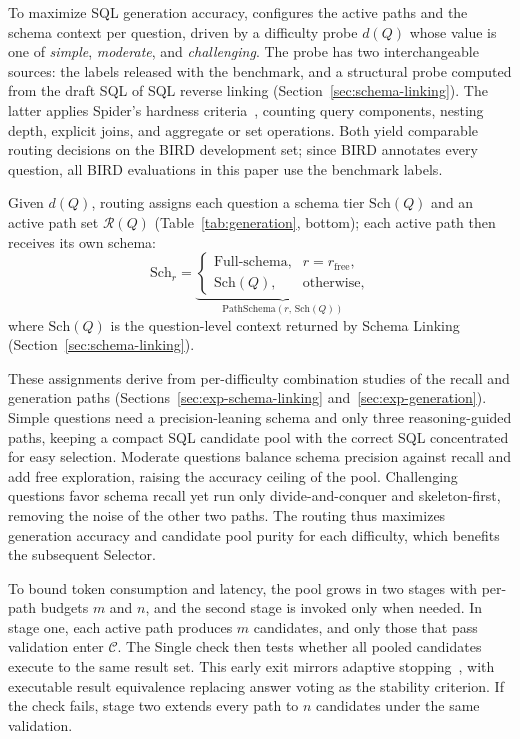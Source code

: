 To maximize SQL generation accuracy, \systemname{} configures the active paths and the
schema context per question, driven by a difficulty probe $d(Q)$ whose value is one of
\emph{simple}, \emph{moderate}, and \emph{challenging}. The probe has two interchangeable
sources: the labels released with the benchmark, and a structural probe computed from the
draft SQL of SQL reverse linking (Section~\ref{sec:schema-linking}). The latter applies
Spider's hardness criteria~\cite{yu2018spider}, counting query components, nesting depth,
explicit joins, and aggregate or set operations. Both yield comparable routing decisions
on the BIRD development set; since BIRD annotates every question, all BIRD evaluations in
this paper use the benchmark labels.

Given $d(Q)$, routing assigns each question a schema tier $\mathrm{Sch}(Q)$ and an active
path set $\mathcal{R}(Q)$ (Table~\ref{tab:generation}, bottom); each active path then
receives its own schema:
\begin{equation}
\mathrm{Sch}_r =
\underbrace{
\begin{cases}
\text{Full-schema}, & r = r_\text{free},\\
\mathrm{Sch}(Q), & \text{otherwise},
\end{cases}
}_{\mathrm{PathSchema}(r,\,\mathrm{Sch}(Q))}
\tag{1}
\end{equation}
where $\mathrm{Sch}(Q)$ is the question-level context returned by Schema Linking
(Section~\ref{sec:schema-linking}).

These assignments derive from per-difficulty combination studies of the recall and
generation paths (Sections~\ref{sec:exp-schema-linking} and~\ref{sec:exp-generation}).
Simple questions need a precision-leaning schema and only three reasoning-guided paths,
keeping a compact SQL candidate pool with the correct SQL concentrated for easy selection.
Moderate questions balance schema precision against recall and add free exploration,
raising the accuracy ceiling of the pool. Challenging questions favor schema recall yet
run only divide-and-conquer and skeleton-first, removing the noise of the other two
paths. The routing thus maximizes generation accuracy and candidate pool purity for each
difficulty, which benefits the subsequent Selector.

To bound token consumption and latency, the pool grows in two stages with per-path
budgets $m$ and $n$, and the second stage is invoked only when needed. In stage one, each
active path produces $m$ candidates, and only those that pass validation enter
$\mathcal{C}$. The Single check then tests whether all pooled candidates execute to the
same result set. This early exit mirrors adaptive
stopping~\cite{aggarwal2023adaptiveconsistency}, with executable result equivalence
replacing answer voting as the stability criterion. If the check fails, stage two extends
every path to $n$ candidates under the same validation.

